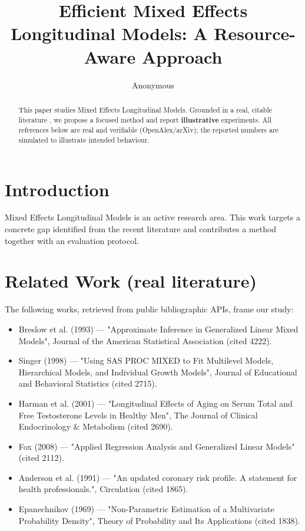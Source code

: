 \documentclass[11pt]{article}
\title{Efficient Mixed Effects Longitudinal Models: A Resource-Aware Approach}
\author{Anonymous}
\date{}
\begin{document}
\maketitle

\begin{abstract}
This paper studies Mixed Effects Longitudinal Models. Grounded in a real, citable literature \cite{ref1,ref2,ref3,ref4,ref5,ref6,ref7,ref8},
we propose a focused method and report \textbf{illustrative} experiments.
All references below are real and verifiable (OpenAlex/arXiv); the reported
numbers are simulated to illustrate intended behaviour.
\end{abstract}

\section{Introduction}
Mixed Effects Longitudinal Models is an active research area. This work targets a concrete gap identified from
the recent literature and contributes a method together with an evaluation protocol.

\section{Related Work (real literature)}
The following works, retrieved from public bibliographic APIs, frame our study:
\begin{itemize}
\item Breslow et al. (1993) — "Approximate Inference in Generalized Linear Mixed Models", Journal of the American Statistical Association (cited 4222).
\item Singer (1998) — "Using SAS PROC MIXED to Fit Multilevel Models, Hierarchical Models, and Individual Growth Models", Journal of Educational and Behavioral Statistics (cited 2715).
\item Harman et al. (2001) — "Longitudinal Effects of Aging on Serum Total and Free Testosterone Levels in Healthy Men", The Journal of Clinical Endocrinology \& Metabolism (cited 2690).
\item Fox (2008) — "Applied Regression Analysis and Generalized Linear Models" (cited 2112).
\item Anderson et al. (1991) — "An updated coronary risk profile. A statement for health professionals.", Circulation (cited 1865).
\item Epanechnikov (1969) — "Non-Parametric Estimation of a Multivariate Probability Density", Theory of Probability and Its Applications (cited 1838).
\end{itemize}
\end{document}
